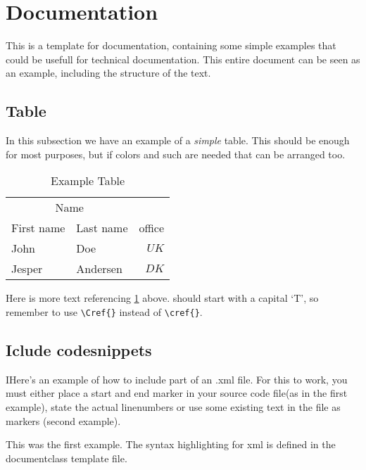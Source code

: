 \section{Documentation}
This is a template for documentation, containing some simple examples that could be usefull for technical documentation. This entire document can be seen as an example, including the structure of the text.

\subsection{Table}

In this subsection we have an example of a \emph{simple} table. This should be enough for most purposes, but if colors and such are needed that can be arranged too. 

\begin{table}[!htb]\centering
	\begin{tabular}{llr}
		\toprule
		\multicolumn{2}{c}{Name} \\
		\cmidrule(r){1-2}
		First name & Last name & office \\
		\midrule
		John & Doe & $ UK$ \\
		Jesper & Andersen & $DK$ \\
		\bottomrule
	\end{tabular}
	\caption{Example Table}
	\label{tab:exampleTable}
\end{table}

Here is more text referencing \cref{tab:exampleTable} above.  should start with a capital `T', so remember to use 
\verb$\Cref{}$ instead of \verb$\cref{}$.

\subsection{Iclude codesnippets}
IHere's an example of how to include part of an .xml file. For this to work, you must either place a start and end marker in your source code file(as in the first example), state the actual linenumbers or use some existing text in the file as markers (second example).
\lstset{language=XML,
	   includerangemarker=false,
	   rangeprefix=<!--\ ,
	   rangesuffix=\ -->}
	   

		        
This was the first example. The syntax highlighting for xml is defined in the documentclass template file.

